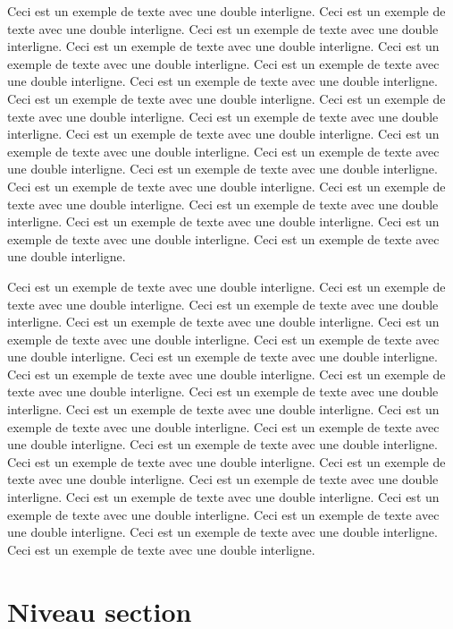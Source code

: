 \documentclass[12pt]{report}
\begin{document}
Ceci est un exemple de texte avec une double interligne. 
Ceci est un exemple de texte avec une double interligne. 
Ceci est un exemple de texte avec une double interligne. 
Ceci est un exemple de texte avec une double interligne. 
Ceci est un exemple de texte avec une double interligne. 
Ceci est un exemple de texte avec une double interligne. 
Ceci est un exemple de texte avec une double interligne. 
Ceci est un exemple de texte avec une double interligne. 
Ceci est un exemple de texte avec une double interligne. 
Ceci est un exemple de texte avec une double interligne. 
Ceci est un exemple de texte avec une double interligne. 
Ceci est un exemple de texte avec une double interligne. 
Ceci est un exemple de texte avec une double interligne. 
Ceci est un exemple de texte avec une double interligne. 
Ceci est un exemple de texte avec une double interligne. 
Ceci est un exemple de texte avec une double interligne. 
Ceci est un exemple de texte avec une double interligne. 
Ceci est un exemple de texte avec une double interligne. 
Ceci est un exemple de texte avec une double interligne. 
Ceci est un exemple de texte avec une double interligne. 

Ceci est un exemple de texte avec une double interligne. 
Ceci est un exemple de texte avec une double interligne. 
Ceci est un exemple de texte avec une double interligne. 
Ceci est un exemple de texte avec une double interligne. 
Ceci est un exemple de texte avec une double interligne. 
Ceci est un exemple de texte avec une double interligne. 
Ceci est un exemple de texte avec une double interligne. 
Ceci est un exemple de texte avec une double interligne. 
Ceci est un exemple de texte avec une double interligne. 
Ceci est un exemple de texte avec une double interligne. 
Ceci est un exemple de texte avec une double interligne. 
Ceci est un exemple de texte avec une double interligne. 
Ceci est un exemple de texte avec une double interligne. 
Ceci est un exemple de texte avec une double interligne. 
Ceci est un exemple de texte avec une double interligne. 
Ceci est un exemple de texte avec une double interligne. 
Ceci est un exemple de texte avec une double interligne. 
Ceci est un exemple de texte avec une double interligne. 
Ceci est un exemple de texte avec une double interligne. 
Ceci est un exemple de texte avec une double interligne. 
Ceci est un exemple de texte avec une double interligne. 
Ceci est un exemple de texte avec une double interligne.

\section{Niveau section}
\end{document}
